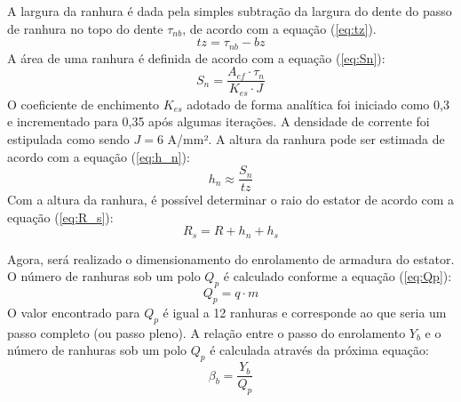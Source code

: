 \documentclass[conference]{IEEEtran}
\begin{document}
A largura da ranhura é dada pela simples subtração da largura do dente do passo de ranhura no topo do dente $\tau_{nb}$, de acordo com a equação (\ref{eq:tz}).
\begin{equation}
tz = \tau_{nb} - bz
\label{eq:tz}
\end{equation}
A área de uma ranhura é definida de acordo com a equação (\ref{eq:Sn}):
\begin{equation}
S_n = \frac{A_{ef} \cdot \tau_n}{K_{es} \cdot J}
\label{eq:Sn}
\end{equation}
O coeficiente de enchimento $K_{es}$ adotado de forma analítica foi iniciado como 0,3 e incrementado para 0,35 após algumas iterações. A densidade de corrente foi estipulada como sendo $J = 6$ A/mm².
A altura da ranhura pode ser estimada de acordo com a equação (\ref{eq:h_n}):
\begin{equation}
h_n \approx \frac{S_n}{tz}
\label{eq:h_n}
\end{equation}
Com a altura da ranhura, é possível determinar o raio do estator de acordo com a equação (\ref{eq:R_s}):
\begin{equation}
R_s = R + h_n + h_s
\label{eq:R_s}
\end{equation}

Agora, será realizado o dimensionamento do enrolamento de armadura do estator. O número de ranhuras sob um polo $Q_p$ é calculado conforme a equação (\ref{eq:Qp}):
\begin{equation}
Q_p= q \cdot m
\label{eq:Qp}
\end{equation}
O valor encontrado para $Q_p$ é igual a 12 ranhuras e corresponde ao que seria um passo completo (ou passo pleno).
A relação entre o passo do enrolamento $Y_b$ e o número de ranhuras sob um polo $Q_p$ é calculada através da próxima equação:
\begin{equation}
\beta_b = \frac{Y_b}{Q_p}
\label{eq:Betab}
\end{equation}
\end{document}
